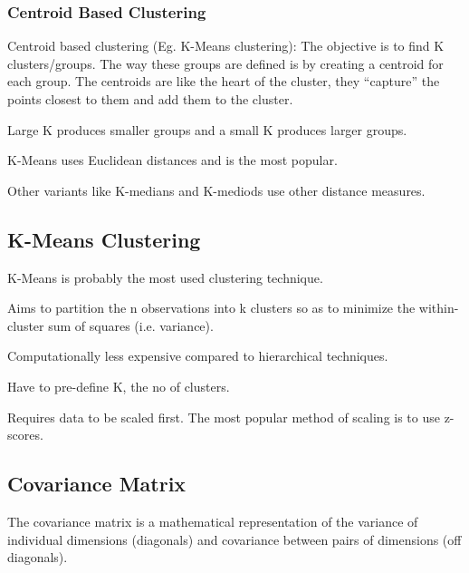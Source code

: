	\subsubsection{Centroid Based Clustering}
Centroid based clustering (Eg. K-Means clustering): The objective is to find K clusters/groups. The way these groups are defined is by creating a centroid for each group. The centroids
are like the heart of the cluster, they ``capture'' the points closest to them and add them to the cluster.

	\begin{bulletedlist}
		\item Large K produces smaller groups and a small K produces larger groups.
		\item K-Means uses Euclidean distances and is the most popular.
		\item Other variants like K-medians and K-mediods use other distance measures.
	\end{bulletedlist}

	\subsection{K-Means Clustering}

	\begin{bulletedlist}
		\item K-Means is probably the most used clustering technique.
		\item Aims to partition the n observations into k clusters so as to minimize the within-cluster sum of squares (i.e. variance).
		\item Computationally less expensive compared to hierarchical techniques.
		\item Have to pre-define K, the no of clusters.
		\item Requires data to be scaled first.  The most popular method of scaling is to use z-scores.
	\end{bulletedlist}

	\subsection{Covariance Matrix}
The covariance matrix is a mathematical representation of the variance of individual dimensions (diagonals) and covariance between pairs of dimensions (off diagonals).
